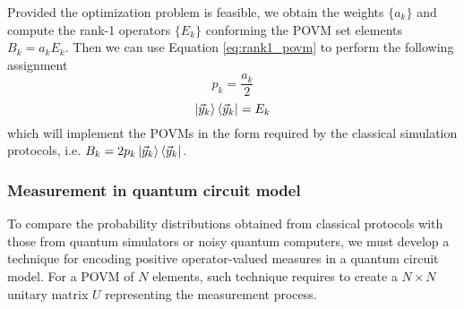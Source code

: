 Provided the optimization problem is feasible, we obtain the weights $\{a_k\}$ and compute the rank-1 operators $\{E_k\}$ conforming the POVM set elements $B_k=a_k E_k$. Then we can use Equation \ref{eq:rank1_povm} to perform the following assignment
\begin{equation}
    p_k = \frac{a_k}{2}
\end{equation}
\begin{equation}
    \ket{\vec{y}_k}\bra{\vec{y}_k} = E_k
\end{equation}
which will implement the POVMs in the form required by the classical simulation protocols, i.e. $B_{k} = 2p_{k}\ket{\vec{y}_{k}}\bra{\vec{y}_{k}}$.

\subsubsection{Measurement in quantum circuit model}\label{section:neumark}
To compare the probability distributions obtained from classical protocols with those from quantum simulators or noisy quantum computers, we must develop a technique for encoding positive operator-valued measures in a quantum circuit model. For a POVM of $N$ elements, such technique requires to create a $N\times N$ unitary matrix $U$ representing the measurement process.

